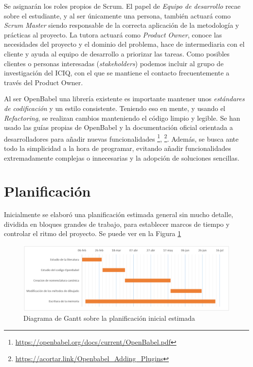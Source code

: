 Se asignarán los roles propios de Scrum. El papel de \emph{Equipo de desarrollo} recae sobre el estudiante, y al ser únicamente una persona, también actuará como \emph{Scrum Master} siendo responsable de la correcta aplicación de la metodología y prácticas al proyecto. La tutora actuará como \emph{Product Owner}, conoce las necesidades del proyecto y el dominio del problema, hace de intermediaria con el cliente y ayuda al equipo de desarrollo a priorizar las tareas. Como posibles clientes o personas interesadas (\emph{stakeholders}) podemos incluir al grupo de investigación del ICIQ, con el que se mantiene el contacto frecuentemente a través del Product Owner.

Al ser OpenBabel una librería existente es importante mantener unos \emph{estándares de codificación} y un estilo consistente. Teniendo eso en mente, y usando el \emph{Refactoring}, se realizan cambios manteniendo el código limpio y legible. Se han usado las guías propias de OpenBabel y la documentación oficial orientada a desarrolladores para añadir nuevas funcionalidades \footnote{\url{https://openbabel.org/docs/current/OpenBabel.pdf}}, \footnote{\url{https://acortar.link/Openbabel_Adding_Plugins}}. Además, se busca ante todo la simplicidad a la hora de programar, evitando añadir funcionalidades extremadamente complejas o innecesarias y la adopción de soluciones sencillas.

\section{Planificación}
Inicialmente se elaboró una planificación estimada general sin mucho detalle, dividida en bloques grandes de trabajo, para establecer marcos de tiempo y controlar el ritmo del proyecto. Se puede ver en la Figura \ref{fig:gantt_incial_estimado}
\begin{figure}[h!]
    \centering
    \includegraphics[scale=0.32]{imagenes/planificacion/planificacion_estimada.png}
    \caption{Diagrama de Gantt sobre la planificación inicial estimada}
    \label{fig:gantt_incial_estimado}
\end{figure}


